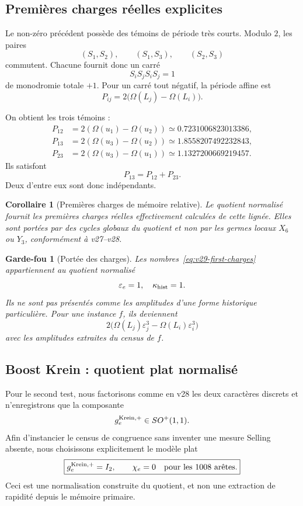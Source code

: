 \documentclass[11pt,a4paper]{article}
\newtheorem{corollary}[theorem]{Corollaire}
\newtheorem{guardrail}[theorem]{Garde-fou}
\begin{document}
\subsection{Premières charges réelles explicites}

Le non-zéro précédent possède des témoins de période très courts. Modulo $2$, les paires
\[
 (S_1,S_2),\qquad
 (S_1,S_3),\qquad
 (S_2,S_3)
\]
commutent. Chacune fournit donc un carré
\[
 S_iS_jS_iS_j=1
\]
de monodromie totale $+1$. Pour un carré tout négatif, la période affine est
\[
 P_{ij}
 =
 2\bigl(
 \Omega(L_j)-\Omega(L_i)
 \bigr).
\]

On obtient les trois témoins :
\begin{equation}\label{eq:v29-first-charges}
 \boxed{
 \begin{aligned}
 P_{12}
 &=2(\Omega(u_1)-\Omega(u_2))
 \simeq0.7231006823013386,\\
 P_{13}
 &=2(\Omega(u_3)-\Omega(u_2))
 \simeq1.8558207492232843,\\
 P_{23}
 &=2(\Omega(u_3)-\Omega(u_1))
 \simeq1.1327200669219457.
 \end{aligned}}
\end{equation}
Ils satisfont
\[
 P_{13}=P_{12}+P_{23}.
\]
Deux d'entre eux sont donc indépendants.

\begin{corollary}[Premières charges de mémoire relative]\label{cor:v29-first-real-memory}
Le quotient normalisé fournit les premières charges réelles effectivement calculées de cette lignée. Elles sont portées par des cycles globaux du quotient et non par les germes locaux $X_6$ ou $Y_3$, conformément à v27--v28.
\end{corollary}

\begin{guardrail}[Portée des charges]
Les nombres~\eqref{eq:v29-first-charges} appartiennent au quotient normalisé
\[
 \varepsilon_e=1,\quad\kappa_{\rm hist}=1.
\]
Ils ne sont pas présentés comme les amplitudes d'une forme historique particulière. Pour une instance $f$, ils deviennent
\[
 2\bigl(
 \Omega(L_j)\varepsilon_j^3
 -
 \Omega(L_i)\varepsilon_i^3
 \bigr)
\]
avec les amplitudes extraites du census de $f$.
\end{guardrail}

\subsection{Boost Krein : quotient plat normalisé}

Pour le second test, nous factorisons comme en v28 les deux caractères discrets et n'enregistrons que la composante
\[
 g_e^{\rm Krein,+}\in SO^+(1,1).
\]
Afin d'instancier le census de congruence sans inventer une mesure Selling absente, nous choisissons explicitement le modèle plat
\[
 \boxed{
 g_e^{\rm Krein,+}=I_2,
 \qquad
 \chi_e=0
 \quad\text{pour les }1008\text{ arêtes}.}
\]
Ceci est une normalisation construite du quotient, et non une extraction de rapidité depuis le mémoire primaire.
\end{document}
